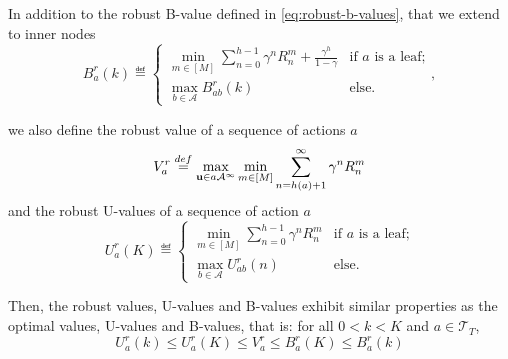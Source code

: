 \documentclass{article}
\begin{document}
\begin{lemma}
	In addition to the robust B-value defined in \eqref{eq:robust-b-values}, that we extend to inner nodes	
	\begin{equation}
	\label{eq:br}
	B_a^r(k)  \eqdef
	\begin{cases}
	\min_{m\in[M]} \sum_{n=0}^{h-1} \gamma^n R_n^m  + \frac{\gamma^h}{1-\gamma}&\text{if } a \text{ is a leaf;}\\
	\max_{b\in\mathcal{A}} B_{ab}^r(k) & \text{else.}
	\end{cases},
	\end{equation}
	
	we also define the robust value of a sequence of actions $a$
	\begin{equation}
	\label{eq:max_vr}
	V_a^r \stackrel{def}{=} \max_{\mathbf{u} \in a\mathcal{A^\infty}} \min_{m\in[M]} \sum_{n=h(a)+1}^\infty \gamma^n R^m_n
	\end{equation}
	and the robust U-values of a sequence of action $a$
	\begin{equation}
	\label{eq:ur}
	U_a^r(K)  \eqdef
	\begin{cases}
	\min_{m\in[M]} \sum_{n=0}^{h-1} \gamma^n R_n^m &\text{if } a \text{ is a leaf;}\\
	\max_{b\in\mathcal{A}} U_{ab}^r(n) & \text{else.}
	\end{cases}
	\end{equation}
	
	Then, the robust values, U-values and B-values exhibit similar properties as the optimal values, U-values and B-values, that is: for all $0 < k < K$ and $a\in\mathcal{T}_T$,
	\begin{equation}
	U^r_a(k) \leq U^r_a(K) \leq V^r_a \leq B^r_a(K) \leq B^r_a(k)
	\end{equation}
	\label{lemma:uvb}
\end{lemma}
\end{document}
